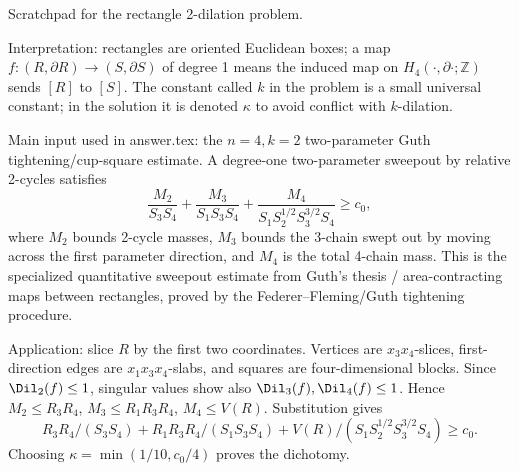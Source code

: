 \documentclass[12pt]{article}
\begin{document}
Scratchpad for the rectangle 2-dilation problem.

Interpretation: rectangles are oriented Euclidean boxes; a map
\(f:(R,\partial R)\to(S,\partial S)\) of degree 1 means the induced map on
\(H_4(\cdot,\partial\cdot;\mathbb Z)\) sends \([R]\) to \([S]\).
The constant called \(k\) in the problem is a small universal constant;
in the solution it is denoted \(\kappa\) to avoid conflict with
\(k\)-dilation.

Main input used in answer.tex: the \(n=4,k=2\) two-parameter
Guth tightening/cup-square estimate.  A degree-one two-parameter sweepout by relative 2-cycles satisfies
\[
 \frac{M_2}{S_3S_4}+
 \frac{M_3}{S_1S_3S_4}+
 \frac{M_4}{S_1S_2^{1/2}S_3^{3/2}S_4}\ge c_0,
\]
where \(M_2\) bounds 2-cycle masses, \(M_3\) bounds the 3-chain swept out by moving across the first parameter direction, and \(M_4\) is the total 4-chain mass.  This is the specialized quantitative
sweepout estimate from Guth's thesis / area-contracting maps between
rectangles, proved by the Federer--Fleming/Guth tightening procedure.

Application: slice \(R\) by the first two coordinates.  Vertices are
\(x_3x_4\)-slices, first-direction edges are \(x_1x_3x_4\)-slabs, and
squares are four-dimensional blocks.  Since \(\Dil_2(f)\le 1\), singular
values show also \(\Dil_3(f),\Dil_4(f)\le1\).  Hence
\(M_2\le R_3R_4\), \(M_3\le R_1R_3R_4\), \(M_4\le V(R)\).
Substitution gives
\[
 R_3R_4/(S_3S_4)+R_1R_3R_4/(S_1S_3S_4)
 +V(R)/(S_1S_2^{1/2}S_3^{3/2}S_4)\ge c_0.
\]
Choosing \(\kappa=\min(1/10,c_0/4)\) proves the dichotomy.
\end{document}
